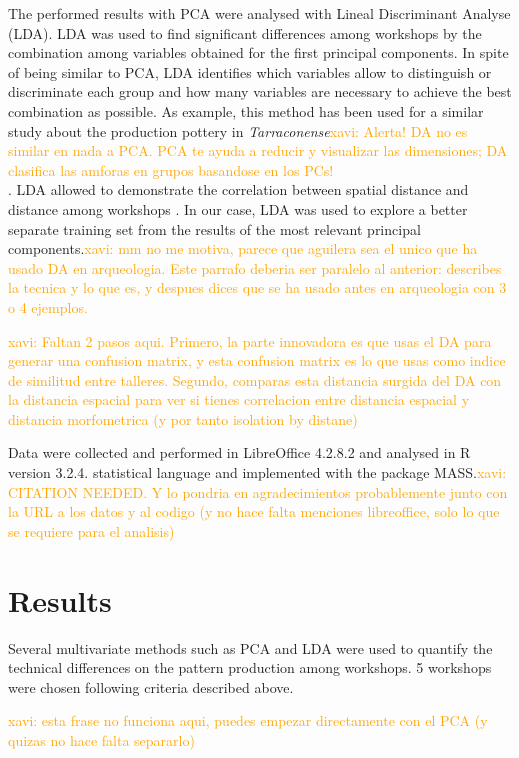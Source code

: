 \documentclass[review]{elsarticle}
\newcommand{\memo}[2]{\textcolor{#1}{#2}}
\newcommand{\xavi}[1]{\memo{orange}{xavi: #1\\}}
\begin{document}
The performed results with PCA were analysed with Lineal Discriminant Analyse (LDA). LDA was used to find significant differences among workshops by the combination among variables obtained for the first principal components. In spite of being similar to PCA, LDA identifies which variables allow to distinguish or discriminate each group and how many variables are necessary to achieve the best combination as possible. As example, this method has been used for a similar study about the production pottery in \emph{Tarraconense}\xavi{Alerta! DA no es similar en nada a PCA. PCA te ayuda a reducir y visualizar las dimensiones; DA clasifica las amforas en grupos basandose en los PCs!}. LDA allowed to demonstrate the correlation between spatial distance and distance among workshops \citep{i_martin_alisis_1998}. In our case, LDA was used to explore a better separate training set from the results of the most relevant principal components.\xavi{mm no me motiva, parece que aguilera sea el unico que ha usado DA en arqueologia. Este parrafo deberia ser paralelo al anterior: describes la tecnica y lo que es, y despues dices que se ha usado antes en arqueologia con 3 o 4 ejemplos.} 


\xavi{Faltan 2 pasos aqui. Primero, la parte innovadora es que usas el DA para generar una confusion matrix, y esta confusion matrix es lo que usas como indice de similitud entre talleres. Segundo, comparas esta distancia surgida del DA con la distancia espacial para ver si tienes correlacion entre distancia espacial y distancia morfometrica (y por tanto isolation by distane)}

Data were collected and performed in LibreOffice 4.2.8.2 and analysed in R version 3.2.4. statistical language and implemented with the package MASS.\xavi{CITATION NEEDED. Y lo pondria en agradecimientos probablemente junto con la URL a los datos y al codigo (y no hace falta menciones libreoffice, solo lo que se requiere para el analisis)}

\section{Results}

Several multivariate methods such as PCA and LDA were used to quantify the technical differences on the pattern production among workshops. 5 workshops were chosen following criteria described above. 

\xavi{esta frase no funciona aqui, puedes empezar directamente con el PCA (y quizas no hace falta separarlo)}
\end{document}
